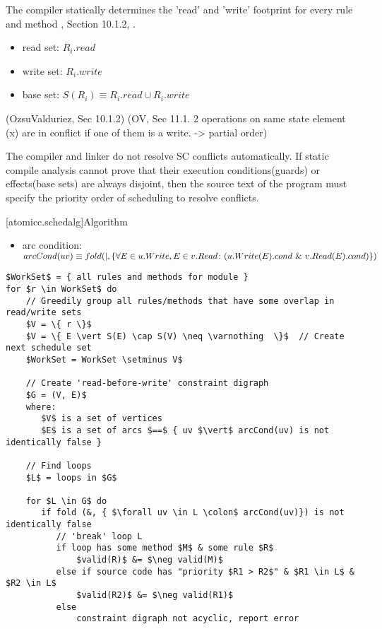 The compiler statically determines the 'read' and 'write'
footprint for every rule and method \cite{OV11}, Section 10.1.2, \cite{doi:10.1137/0213032}.
\begin{itemize}
\item read set: $R_{i}.read$
\item write set: $R_{i}.write$
\item base set: $S(R_{i}) \equiv R_{i}.read \cup R_{i}.write$
\end{itemize}
(OzsuValduriez, Sec 10.1.2)
(OV, Sec 11.1.  2 operations on same state element (x) are in conflict if
one of them is a write. -> partial order)

The compiler and linker do not resolve SC conflicts automatically.
If static compile analysis cannot prove that their execution conditions(guards) or
effects(base sets) are always disjoint,
then the source text of the program must specify the priority order of scheduling
to resolve conflicts.

[atomicc.schedalg]{Algorithm}
\begin{itemize}
\item arc condition: $arcCond(uv) \equiv
\newline
      fold (|, \{ \forall E \in u.Write, E \in v.Read \colon (u.Write(E).cond\ \&\ v.Read(E).cond) \})$
\end{itemize}

\begin{lstlisting}[mathescape=true]
$WorkSet$ = { all rules and methods for module }
for $r \in WorkSet$ do
    // Greedily group all rules/methods that have some overlap in read/write sets
    $V = \{ r \}$
    $V = \{ E \vert S(E) \cap S(V) \neq \varnothing  \}$  // Create next schedule set
    $WorkSet = WorkSet \setminus V$

    // Create 'read-before-write' constraint digraph
    $G = (V, E)$
    where: 
       $V$ is a set of vertices
       $E$ is a set of arcs $==$ { uv $\vert$ arcCond(uv) is not identically false }

    // Find loops
    $L$ = loops in $G$

    for $L \in G$ do
       if fold (&, { $\forall uv \in L \colon$ arcCond(uv)}) is not identically false
          // 'break' loop L
          if loop has some method $M$ & some rule $R$
              $valid(R)$ &= $\neg valid(M)$
          else if source code has "priority $R1 > R2$" & $R1 \in L$ & $R2 \in L$
              $valid(R2)$ &= $\neg valid(R1)$
          else
              constraint digraph not acyclic, report error
\end{lstlisting}

